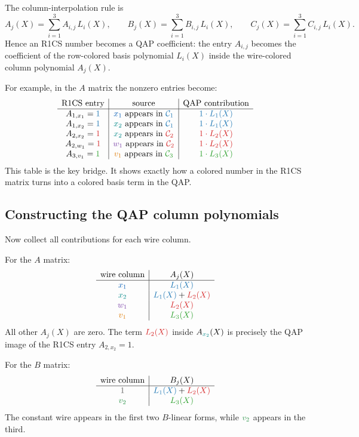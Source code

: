 The column-interpolation rule is
\[
\boxed{
    A_j(X)=\sum_{i=1}^{3} A_{i,j}\,L_i(X),
    \qquad
    B_j(X)=\sum_{i=1}^{3} B_{i,j}\,L_i(X),
    \qquad
    C_j(X)=\sum_{i=1}^{3} C_{i,j}\,L_i(X).
}
\]
Hence an R1CS number becomes a QAP coefficient: the entry $A_{i,j}$ becomes the coefficient of the row-colored basis polynomial $L_i(X)$ inside the wire-colored column polynomial $A_j(X)$.

For example, in the $A$ matrix the nonzero entries become:
\[
\begin{array}{c|c|c}
\text{R1CS entry} & \text{source} & \text{QAP contribution} \\
\hline
A_{1,x_1}=\rowone{1} & \xone{x_1}\text{ appears in }\rowone{\mathcal C_1} & \rowone{1\cdot L_1(X)} \\
A_{1,x_2}=\rowone{1} & \xtwo{x_2}\text{ appears in }\rowone{\mathcal C_1} & \rowone{1\cdot L_1(X)} \\
A_{2,x_2}=\rowtwo{1} & \xtwo{x_2}\text{ appears in }\rowtwo{\mathcal C_2} & \rowtwo{1\cdot L_2(X)} \\
A_{2,w_1}=\rowtwo{1} & \wone{w_1}\text{ appears in }\rowtwo{\mathcal C_2} & \rowtwo{1\cdot L_2(X)} \\
A_{3,v_1}=\rowthree{1} & \vone{v_1}\text{ appears in }\rowthree{\mathcal C_3} & \rowthree{1\cdot L_3(X)}
\end{array}
\]
This table is the key bridge. It shows exactly how a colored number in the R1CS matrix turns into a colored basis term in the QAP.

\subsection{Constructing the QAP column polynomials}

Now collect all contributions for each wire column.

For the $A$ matrix:
\[
\begin{array}{c|c}
\text{wire column} & A_j(X) \\
\hline
\xone{x_1} & \rowone{L_1(X)} \\
\xtwo{x_2} & \rowone{L_1(X)}+\rowtwo{L_2(X)} \\
\wone{w_1} & \rowtwo{L_2(X)} \\
\vone{v_1} & \rowthree{L_3(X)}
\end{array}
\]
All other $A_j(X)$ are zero. The term $\rowtwo{L_2(X)}$ inside $A_{\xtwo{x_2}}(X)$ is precisely the QAP image of the R1CS entry $A_{2,x_2}=1$.

For the $B$ matrix:
\[
\begin{array}{c|c}
\text{wire column} & B_j(X) \\
\hline
\constwire{1} & \rowone{L_1(X)}+\rowtwo{L_2(X)} \\
\vtwo{v_2} & \rowthree{L_3(X)}
\end{array}
\]
The constant wire appears in the first two $B$-linear forms, while $\vtwo{v_2}$ appears in the third.

